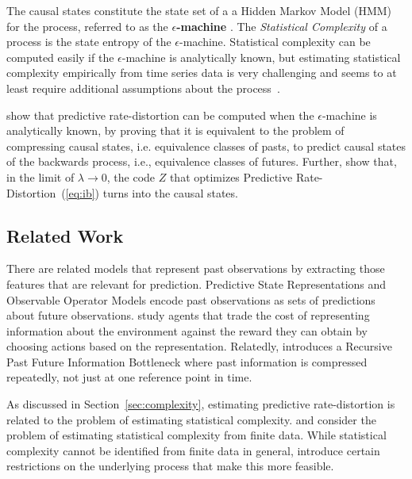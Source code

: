 \documentclass[entropy,article,submit,moreauthors,pdftex,10pt,a4paper]{Definitions/mdpi}
\newcommand{\key}{\textbf}
\begin{document}
The causal states constitute the state set of a a Hidden Markov Model (HMM) for the process, referred to as the \key{$\epsilon$-machine}  \citep{crutchfield-inferring-1989}.
The \emph{Statistical Complexity} of a process is the state entropy of the $\epsilon$-machine.
Statistical complexity can be computed easily if the $\epsilon$-machine is analytically known, but estimating statistical complexity empirically from time series data is very challenging and seems to at least require additional assumptions about the process~\citep{clarke2003application}.

\citet{marzen-predictive-2016} show that predictive rate-distortion can be computed when the $\epsilon$-machine is analytically known, by proving that it is equivalent to the problem of compressing causal states, i.e. equivalence classes of pasts, to predict causal states of the backwards process, i.e., equivalence classes of futures.
Further, \cite{still-optimal-2010} show that, in the limit of $\lambda \rightarrow 0$, the code $Z$ that optimizes Predictive Rate-Distortion~(\ref{eq:ib}) turns into the causal states.



\subsection{Related Work}

There are related models that represent past observations by extracting those features that are relevant for prediction.
Predictive State Representations \citep{singh-learning-2003,singh-predictive-2004} and Observable Operator Models \citep{jaeger1998discrete} encode past observations as sets of predictions about future observations.
\citet{rubin2012trading} study agents that trade the cost of representing information about the environment against the reward they can obtain by choosing actions based on the representation.
Relatedly, \citet{still-information-2014} introduces a Recursive Past Future Information Bottleneck where past information is compressed repeatedly, not just at one reference point in time.


As discussed in Section~\ref{sec:complexity}, estimating predictive rate-distortion is related to the problem of estimating statistical complexity.
\citet{clarke2003application} and \citet{still-optimal-2010} consider the problem of estimating statistical complexity from finite data.
While statistical complexity cannot be identified from finite data in general, \citet{clarke2003application} introduce certain restrictions on the underlying process that make this more feasible.
\end{document}
